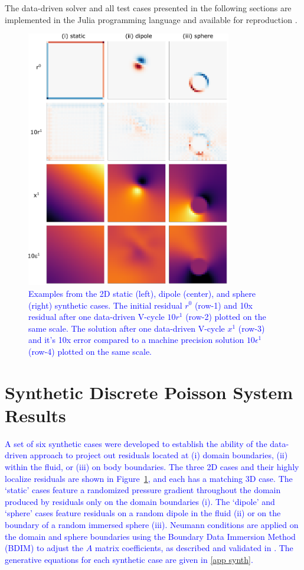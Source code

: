 \documentclass[]{elsarticle}
\begin{document}
The data-driven solver and all test cases presented in the following sections are implemented in the Julia programming language \cite{bezanson2017julia} and available for reproduction \cite{weymouth2021julia}.

\begin{figure}
    \centering
    \includegraphics[width=0.8\textwidth]{figures/synthetic}
    \caption{\textcolor{blue}{Examples from the 2D static (left), dipole (center), and sphere (right) synthetic cases. The initial residual $r^0$ (row-1) and 10x residual after one data-driven V-cycle $10r^1$ (row-2) plotted on the same scale. The solution after one data-driven V-cycle $x^1$ (row-3) and it's 10x error compared to a machine precision solution $10\epsilon^1$ (row-4) plotted on the same scale.}}
    \label{fig:synthetic cases}
\end{figure}

\section{Synthetic Discrete Poisson System Results}

\textcolor{blue}{A set of six synthetic cases were developed to establish the ability of the data-driven approach to project out residuals located at (i) domain boundaries, (ii) within the fluid, or (iii) on body boundaries. The three 2D cases and their highly localize residuals are shown in Figure~\ref{fig:synthetic cases}, and each has a matching 3D case. The `static' cases feature a randomized pressure gradient throughout the domain produced by residuals only on the domain boundaries (i). The `dipole' and `sphere' cases feature residuals on a random dipole in the fluid (ii) or on the boundary of a random immersed sphere (iii). Neumann conditions are applied on the domain and sphere boundaries using the Boundary Data Immersion Method (BDIM) to adjust the $A$ matrix coefficients, as described and validated in \cite{maertens2015accurate,Lauber2022}. The  generative equations for each synthetic case are given in \ref{app synth}.}
\end{document}
